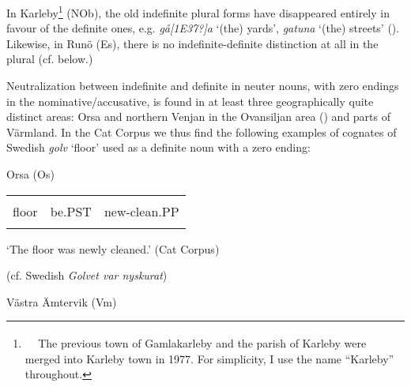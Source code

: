 \begin{styleBodytextC}
In Karleby\footnote{\textsuperscript{\ \ } The previous town of Gamlakarleby and the parish of Karleby were merged into Karleby town in 1977. For simplicity, I use the name “Karleby” throughout. } (NOb), the old indefinite plural forms have disappeared entirely in favour of the definite ones, e.g. \textit{gå[1E37?]a} ‘(the) yards’, \textit{gatuna} ‘(the) streets’ (\citet[93]{Hagfors1891}). Likewise, in Runö (Es), there is no indefinite-definite distinction at all in the plural (cf. below.)

\end{styleBodytextC}

\begin{styleBodytextC}
Neutralization between indefinite and definite in neuter nouns, with zero endings in the nominative/accusative, is found in at least three geographically quite distinct areas: Orsa and northern Venjan in the Ovansiljan area (\citet[133]{Levander1928}) and parts of Värmland. In the Cat Corpus we thus find the following examples of cognates of Swedish \textit{golv} ‘floor’ used as a definite noun with a zero ending:

\end{styleBodytextC}

\begin{listWWNumileveli}
\item 

\begin{styleExample}
Orsa (Os)

\end{styleExample}

\end{listWWNumileveli}

\begin{tabular}{lll}
\lsptoprule
\multicolumn{3}{l}{{\bfseries Gow}

}\\
floor & be.PST & new-clean.PP\\
\lspbottomrule
\end{tabular}

\begin{styleTranslation}
 ‘The floor was newly cleaned.’ (Cat Corpus)

\end{styleTranslation}

(cf. Swedish \textit{Golvet var nyskurat}) 

\begin{listWWNumileveli}
\item 

\begin{styleExample}
Västra Ämtervik (Vm)

\end{styleExample}

\end{listWWNumileveli}

